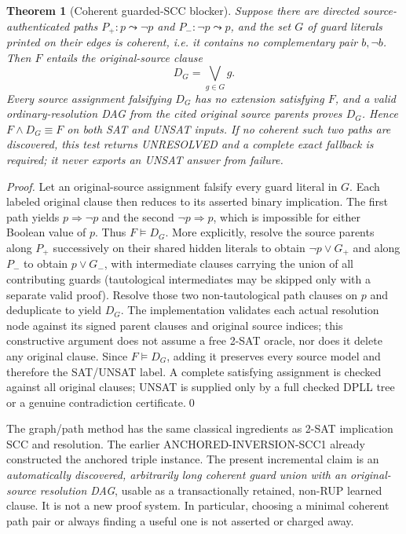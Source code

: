 \documentclass[11pt]{article}
\newtheorem{theorem}{Theorem}
\begin{document}
\begin{theorem}[Coherent guarded-SCC blocker]
Suppose there are directed source-authenticated paths $P_+:p\leadsto\neg p$ and $P_-:\neg p\leadsto p$, and the set $G$ of guard literals printed on their edges is \emph{coherent}, i.e. it contains no complementary pair $b,\neg b$. Then $F$ entails the original-source clause
\[
 D_G=\bigvee_{g\in G}g.
\]
Every source assignment falsifying $D_G$ has no extension satisfying $F$, and a valid ordinary-resolution DAG from the cited original source parents proves $D_G$. Hence $F\land D_G\equiv F$ on \emph{both} SAT and UNSAT inputs. If no coherent such two paths are discovered, this test returns UNRESOLVED and a complete exact fallback is required; it never exports an UNSAT answer from failure.
\end{theorem}
\begin{proof}
Let an original-source assignment falsify every guard literal in $G$. Each labeled original clause then reduces to its asserted binary implication. The first path yields $p\Rightarrow\neg p$ and the second $\neg p\Rightarrow p$, which is impossible for either Boolean value of $p$. Thus $F\models D_G$. More explicitly, resolve the source parents along $P_+$ successively on their shared hidden literals to obtain $\neg p\vee G_+$ and along $P_-$ to obtain $p\vee G_-$, with intermediate clauses carrying the union of all contributing guards (tautological intermediates may be skipped only with a separate valid proof). Resolve those two non-tautological path clauses on $p$ and deduplicate to yield $D_G$. The implementation validates each actual resolution node against its signed parent clauses and original source indices; this constructive argument does not assume a free 2-SAT oracle, nor does it delete any original clause. Since $F\models D_G$, adding it preserves every source model and therefore the SAT/UNSAT label. A complete satisfying assignment is checked against all original clauses; UNSAT is supplied only by a full checked DPLL tree or a genuine contradiction certificate.\qed
\end{proof}

The graph/path method has the same classical ingredients as 2-SAT implication SCC and resolution. The earlier ANCHORED-INVERSION-SCC1 already constructed the anchored triple instance. The present incremental claim is an \emph{automatically discovered, arbitrarily long coherent guard union with an original-source resolution DAG}, usable as a transactionally retained, non-RUP learned clause. It is not a new proof system. In particular, choosing a minimal coherent path pair or always finding a useful one is not asserted or charged away.
\end{document}
